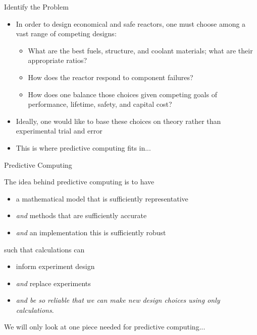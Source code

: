\documentclass[xcolor=x11names]{beamer}
\begin{document}
\begin{frame}{Identify the Problem}
\begin{itemize}
\item In order to design economical and safe reactors, one must choose among a vast range of competing designs:
\begin{itemize}
\item What are the \alert{best} fuels, structure, and coolant materials; what are their appropriate ratios?
\item How does the reactor respond to component failures?
\item How does one balance those choices given competing goals of performance, lifetime, safety, and capital cost? 
\vspace*{1 em}
\end{itemize}
\item Ideally, one would like to base these choices on theory rather than experimental trial and error 
\vspace*{1 em}
\item This is where \textcolor{dgreen}{predictive computing} fits in...
\end{itemize}
\end{frame}


\begin{frame}{Predictive Computing}

The idea behind \alert{predictive computing} is to have
\begin{itemize}
\item a mathematical model that is sufficiently representative
\item \textit{and} methods that are sufficiently accurate
\item \textit{and} an implementation this is sufficiently robust
\end{itemize}
\pause
such that \alert{calculations} can
\begin{itemize}
\item inform experiment design
\item \textit{and} replace experiments
\item \textit{and be so reliable that we can make new design choices using only calculations}.
\end{itemize}
\vspace*{1 em}
We will only look at one piece needed for predictive computing...

\end{frame}
\end{document}
